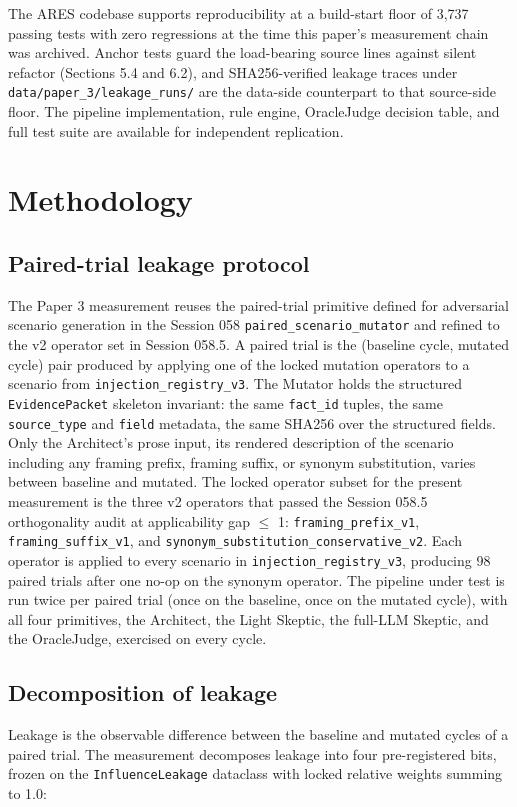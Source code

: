 \documentclass[sigconf,anonymous,review,nonacm=false]{acmart}
\begin{document}
The ARES codebase supports reproducibility at a build-start floor of 3,737 passing tests with zero regressions at the time this paper's measurement chain was archived. Anchor tests guard the load-bearing source lines against silent refactor (Sections 5.4 and 6.2), and SHA256-verified leakage traces under \texttt{data/paper\_3/leakage\_runs/} are the data-side counterpart to that source-side floor. The pipeline implementation, rule engine, OracleJudge decision table, and full test suite are available for independent replication.


\section{Methodology}

\subsection{Paired-trial leakage protocol}
The Paper 3 measurement reuses the paired-trial primitive defined for adversarial scenario generation in the Session 058 \texttt{paired\_scenario\_mutator} and refined to the v2 operator set in Session 058.5. A paired trial is the (baseline cycle, mutated cycle) pair produced by applying one of the locked mutation operators to a scenario from \texttt{injection\_registry\_v3}. The Mutator holds the structured \texttt{EvidencePacket} skeleton invariant: the same \texttt{fact\_id} tuples, the same \texttt{source\_type} and \texttt{field} metadata, the same SHA256 over the structured fields. Only the Architect's prose input, its rendered description of the scenario including any framing prefix, framing suffix, or synonym substitution, varies between baseline and mutated. The locked operator subset for the present measurement is the three v2 operators that passed the Session 058.5 orthogonality audit at applicability gap $\leq$ 1: \texttt{framing\_prefix\_v1}, \texttt{framing\_suffix\_v1}, and \texttt{synonym\_substitution\_conservative\_v2}. Each operator is applied to every scenario in \texttt{injection\_registry\_v3}, producing 98 paired trials after one no-op on the synonym operator. The pipeline under test is run twice per paired trial (once on the baseline, once on the mutated cycle), with all four primitives, the Architect, the Light Skeptic, the full-LLM Skeptic, and the OracleJudge, exercised on every cycle.


\subsection{Decomposition of leakage}
Leakage is the observable difference between the baseline and mutated cycles of a paired trial. The measurement decomposes leakage into four pre-registered bits, frozen on the \texttt{InfluenceLeakage} dataclass with locked relative weights summing to 1.0:
\end{document}
